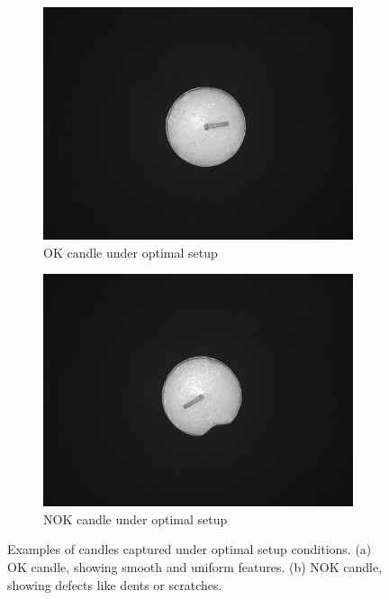\documentclass[12pt,DIV14,BCOR12mm,a4paper,footinclude=false,headinclude,parskip=half-,twoside,openright,cleardoublepage=empty,toc=index,bibliography=totoc,listof=totoc]{scrreprt}
\numberwithin{equation}{chapter}
\begin{document}
\begin{figure}
    \centering
    \begin{subfigure}[b]{0.45\textwidth}
        \centering
        \includegraphics[scale=0.15]{../media/Candles-optimal-OK.png}
        \caption{OK candle under optimal setup}
        \label{fig:candle_ok}
    \end{subfigure}
    \hfill
    \begin{subfigure}[b]{0.45\textwidth}
        \centering
        \includegraphics[scale=0.15]{../media/Candles-optimal-NOK.png}
        \caption{NOK candle under optimal setup}
        \label{fig:candle_nok}
    \end{subfigure}
    \caption{Examples of candles captured under optimal setup conditions. (a) OK candle, showing smooth and uniform features. (b) NOK candle, showing defects like dents or scratches.}
    \label{fig:optimal_setup_candles}
\end{figure}
\end{document}
